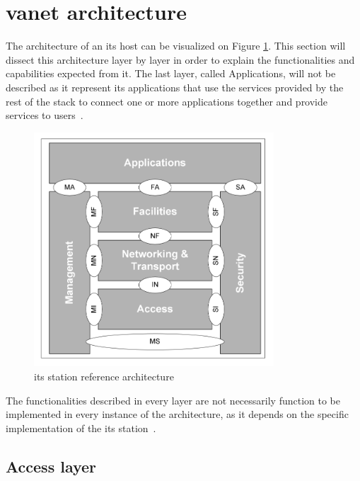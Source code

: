\section[VANET architecture]{\gls{vanet} architecture}
\label{sec:vanet_arch}

The architecture of an \gls{its} host can be visualized on Figure \ref{fig:its_host}. This section will dissect this architecture layer by layer in order to explain the functionalities and capabilities expected from it. The last layer, called Applications, will not be described as it represent \gls{its} applications that use the services provided by the rest of the stack to connect one or more applications together and provide services to users~\cite{etsi_intelligent_2010}.

\begin{figure}[htbp]
    \centering
   	\includegraphics[width=0.8\textwidth]{Chapters/Figures/VANETs/ITS-S_host_arch.png}
    \caption{\gls{its} station reference architecture~\cite{etsi_intelligent_2010}}
   	\label{fig:its_host}
\end{figure}

The functionalities described in every layer are not necessarily function to be implemented in every instance of the architecture, as it depends on the specific implementation of the \gls{its} station~\cite{etsi_intelligent_2010}.

\subsection[Access layer]{Access layer}
\label{subsec:Access_layer}

